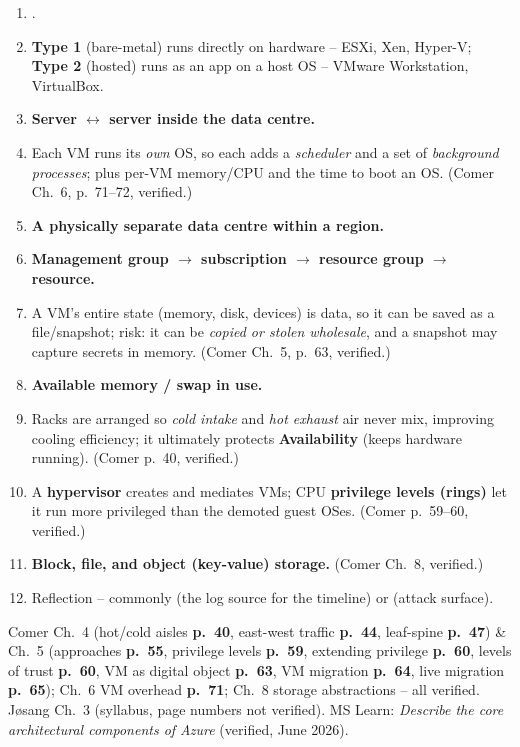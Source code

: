 \documentclass[11pt]{article}
\begin{document}
\begin{enumerate}
\item \textbf{}.
\item \textbf{Type 1} (bare-metal) runs directly on hardware -- ESXi, Xen, Hyper-V; \textbf{Type 2}
      (hosted) runs as an app on a host OS -- VMware Workstation, VirtualBox.
\item \textbf{Server $\leftrightarrow$ server inside the data centre.}
\item Each VM runs its \emph{own} OS, so each adds a \emph{scheduler} and a set of \emph{background
      processes}; plus per-VM memory/CPU and the time to boot an OS. (Comer Ch.~6, p.~71--72,
      verified.)
\item \textbf{A physically separate data centre within a region.}
\item \textbf{Management group $\rightarrow$ subscription $\rightarrow$ resource group $\rightarrow$
      resource.}
\item A VM's entire state (memory, disk, devices) is data, so it can be saved as a file/snapshot;
      risk: it can be \emph{copied or stolen wholesale}, and a snapshot may capture secrets in memory.
      (Comer Ch.~5, p.~63, verified.)
\item \textbf{Available memory / swap in use.}
\item Racks are arranged so \emph{cold intake} and \emph{hot exhaust} air never mix, improving cooling
      efficiency; it ultimately protects \textbf{Availability} (keeps hardware running). (Comer p.~40,
      verified.)
\item A \textbf{hypervisor} creates and mediates VMs; CPU \textbf{privilege levels (rings)} let it run
      more privileged than the demoted guest OSes. (Comer p.~59--60, verified.)
\item \textbf{Block, file, and object (key-value) storage.} (Comer Ch.~8, verified.)
\item Reflection -- commonly  (the log source for the timeline) or  (attack
      surface).
\end{enumerate}

Comer Ch.~4 (hot/cold aisles \textbf{p.~40}, east-west traffic \textbf{p.~44}, leaf-spine
\textbf{p.~47}) \& Ch.~5 (approaches \textbf{p.~55}, privilege levels \textbf{p.~59}, extending
privilege \textbf{p.~60}, levels of trust \textbf{p.~60}, VM as digital object \textbf{p.~63}, VM
migration \textbf{p.~64}, live migration \textbf{p.~65}); Ch.~6 VM overhead \textbf{p.~71}; Ch.~8
storage abstractions -- all verified. J\o sang Ch.~3 (syllabus, page numbers not verified). MS Learn:
\emph{Describe the core architectural components of Azure} (verified, June 2026).
\end{document}
